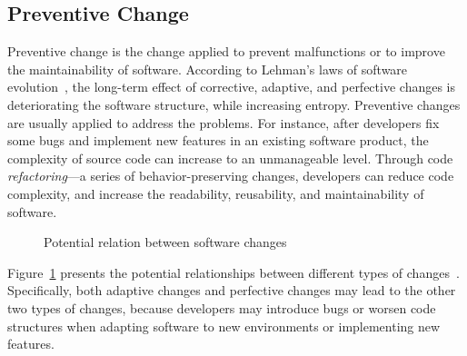 \subsection{Preventive Change}
Preventive change is the change applied to prevent malfunctions or to improve the maintainability of software. 
According to Lehman's laws of software evolution~\cite{Lehman1984:ULE}, the long-term effect of corrective, adaptive, and perfective changes is deteriorating the software structure, while increasing entropy. Preventive changes are usually applied to address the problems. For instance, after developers fix some bugs and implement new features in an existing software product, the complexity of source code can increase to an unmanageable level. Through code {\em refactoring}---a series of behavior-preserving changes, developers can reduce code complexity, and increase the readability, reusability, and maintainability of software.
\begin{figure}[!htb]
\centering
{}
\caption{Potential relation between software changes~\cite{Seaman2008:SMC}}
\label{fig:relation}
\end{figure}

Figure~\ref{fig:relation} presents the potential relationships between different types of changes~\cite{Seaman2008:SMC}. Specifically, both adaptive changes and perfective changes may lead to the other two types of changes, because developers may introduce bugs or worsen code structures when adapting software to new environments or implementing new features.

